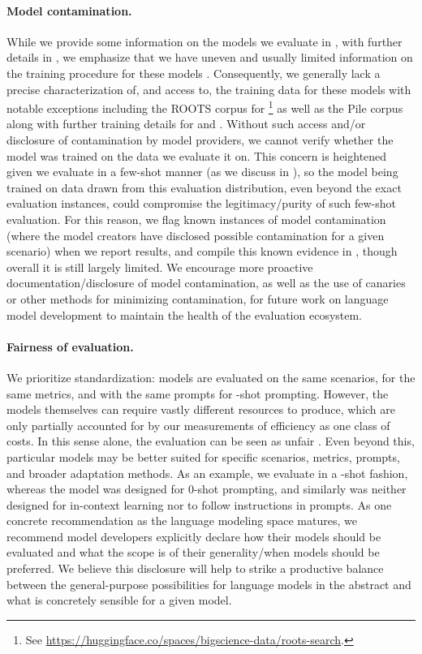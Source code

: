 \paragraph{Model contamination.}
While we provide some information on the models we evaluate in , with further details in , we emphasize that we have uneven and usually limited information on the training procedure for these models \citep[see][]{liang2022community-norms}.
Consequently, we generally lack a precise characterization of, and access to, the training data for these models with notable exceptions including the ROOTS corpus for  \bloom\footnote{See \url{https://huggingface.co/spaces/bigscience-data/roots-search}.} as well as the Pile corpus along with further training details for \gptj and \gptneox \citep[see][]{biderman2022datasheet}. 
Without such access and/or disclosure of contamination by model providers, we cannot verify whether the model was trained on the data we evaluate it on.
This concern is heightened given we evaluate in a few-shot manner (as we discuss in ), so the model being trained on data drawn from this evaluation distribution, even beyond the exact evaluation instances, could compromise the legitimacy/purity of such few-shot evaluation.
For this reason, we flag known instances of model contamination (\ie where the model creators have disclosed possible contamination for a given scenario) when we report results, and compile this known evidence in , though overall it is still largely limited.
We encourage more proactive documentation/disclosure of model contamination, as well as the use of canaries or other methods for minimizing contamination, for future work on language model development to maintain the health of the evaluation ecosystem.

\paragraph{Fairness of evaluation.}
We prioritize standardization: models are evaluated on the same scenarios, for the same metrics, and with the same prompts for \numincontext-shot prompting.
However, the models themselves can require vastly different resources to produce, which are only partially accounted for by our measurements of efficiency as one class of costs. 
In this sense alone, the evaluation can be seen as unfair \citep[\cf][\S4.4]{linzen2020accelerate, bommasani2021opportunities}.
Even beyond this, particular models may be better suited for specific scenarios, metrics, prompts, and broader adaptation methods.
As an example, we evaluate \tzero in a \numincontext-shot fashion, whereas the model was designed for 0-shot prompting, and \tfive similarly was neither designed for in-context learning nor to follow instructions in prompts. 
As one concrete recommendation as the language modeling space matures, we recommend model developers explicitly declare how their models should be evaluated and what the scope is of their generality/when models should be preferred.
We believe this disclosure will help to strike a productive balance between the general-purpose possibilities for language models in the abstract and what is concretely sensible for a given model. 

